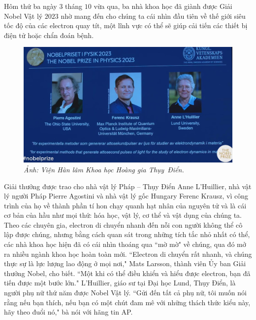 \begin{multicols}{2}
	Hôm thứ ba ngày $3$ tháng $10$ vừa qua, ba nhà khoa học đã giành được Giải Nobel Vật lý $2023$ nhờ mang đến cho chúng ta cái nhìn đầu tiên về thế giới siêu tốc độ của các electron quay tít, một lĩnh vực có thể sẽ giúp cải tiến các thiết bị điện tử hoặc chẩn đoán bệnh.
	\begin{figure}[H]
		\vspace*{-5pt}
		\centering
		\captionsetup{labelformat= empty, justification=centering}
		\includegraphics[width= 1\linewidth]{1}
		\caption{\small\textit{\color{timhieukhoahoc}Ảnh: Viện Hàn lâm Khoa học Hoàng gia Thụy~Điển.}}
		\vspace*{-10pt}
	\end{figure}
	Giải thưởng được trao cho nhà vật lý Pháp -- Thụy Điển Anne L'Huillier, nhà vật lý người Pháp Pierre Agostini và nhà vật lý gốc Hungary Ferenc Krausz, vì công trình của họ về thành phần tí hon chạy quanh hạt nhân của nguyên tử và là cái cơ bản của hầu như mọi thứ: hóa học, vật lý, cơ thể và vật dụng của chúng ta.
	\vskip 0.1cm
	Theo các chuyên gia, electron di chuyển nhanh đến nỗi con người không thể cô lập được chúng, nhưng bằng cách quan sát trong những tích tắc nhỏ nhất có thể, các nhà khoa học hiện đã có cái nhìn thoáng qua ``mờ mờ" về chúng, qua đó mở ra nhiều ngành khoa học hoàn toàn mới.
	\vskip 0.1cm
	``Electron di chuyển rất nhanh, và chúng thực sự là lực lượng lao động ở mọi nơi," Mats Larsson, thành viên Ủy ban Giải thưởng Nobel, cho biết. ``Một khi có thể điều khiển và hiểu được electron, bạn đã tiến được một bước lớn."
	\vskip 0.1cm
	L'Huillier, giáo sư tại Đại học Lund, Thụy Điển, là người phụ nữ thứ năm được Nobel Vật lý.
	\vskip 0.1cm
	``Gửi đến tất cả phụ nữ, tôi muốn nói rằng nếu bạn thích, nếu bạn có một chút đam mê với những thách thức kiểu này, hãy theo đuổi nó," bà nói với hãng tin AP.

\end{multicols}
